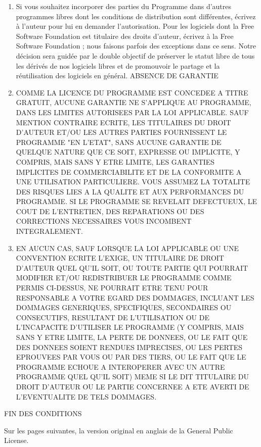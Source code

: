 {\begin{enumerate}
\item  Si vous souhaitez incorporer des parties du Programme dans d'autres programmes libres dont les conditions de distribution sont différentes, écrivez à l'auteur pour lui en demander l'autorisation. Pour les logiciels dont la Free Software Foundation est titulaire des droits d'auteur, écrivez à la Free Software Foundation ; nous faisons parfois des exceptions dans ce sens. Notre décision sera guidée par le double objectif de préserver le statut libre de tous les dérivés de nos logiciels libres et de promouvoir le partage et la réutilisation des logiciels en général.
ABSENCE DE GARANTIE

\item  COMME LA LICENCE DU PROGRAMME EST CONCEDEE A TITRE GRATUIT, AUCUNE GARANTIE NE S'APPLIQUE AU PROGRAMME, DANS LES LIMITES AUTORISEES PAR LA LOI APPLICABLE. SAUF MENTION CONTRAIRE ECRITE, LES TITULAIRES DU DROIT D'AUTEUR ET/OU LES AUTRES PARTIES FOURNISSENT LE PROGRAMME "EN L'ETAT", SANS AUCUNE GARANTIE DE QUELQUE NATURE QUE CE SOIT, EXPRESSE OU IMPLICITE, Y COMPRIS, MAIS SANS Y ETRE LIMITE, LES GARANTIES IMPLICITES DE COMMERCIABILITE ET DE LA CONFORMITE A UNE UTILISATION PARTICULIERE. VOUS ASSUMEZ LA TOTALITE DES RISQUES LIES A LA QUALITE ET AUX PERFORMANCES DU PROGRAMME. SI LE PROGRAMME SE REVELAIT DEFECTUEUX, LE COUT DE L'ENTRETIEN, DES REPARATIONS OU DES CORRECTIONS NECESSAIRES VOUS INCOMBENT INTEGRALEMENT.

\item  EN AUCUN CAS, SAUF LORSQUE LA LOI APPLICABLE OU UNE CONVENTION ECRITE L'EXIGE, UN TITULAIRE DE DROIT D'AUTEUR QUEL QU'IL SOIT, OU TOUTE PARTIE QUI POURRAIT MODIFIER ET/OU REDISTRIBUER LE PROGRAMME COMME PERMIS CI-DESSUS, NE POURRAIT ETRE TENU POUR RESPONSABLE A VOTRE EGARD DES DOMMAGES, INCLUANT LES DOMMAGES GENERIQUES, SPECIFIQUES, SECONDAIRES OU CONSECUTIFS, RESULTANT DE L'UTILISATION OU DE L'INCAPACITE D'UTILISER LE PROGRAMME (Y COMPRIS, MAIS SANS Y ETRE LIMITE, LA PERTE DE DONNEES, OU LE FAIT QUE DES DONNEES SOIENT RENDUES IMPRECISES, OU LES PERTES EPROUVEES PAR VOUS OU PAR DES TIERS, OU LE FAIT QUE LE PROGRAMME ECHOUE A INTEROPERER AVEC UN AUTRE PROGRAMME QUEL QU'IL SOIT) MEME SI LE DIT TITULAIRE DU DROIT D'AUTEUR OU LE PARTIE CONCERNEE A ETE AVERTI DE L'EVENTUALITE DE TELS DOMMAGES.

		\end{enumerate}


FIN DES CONDITIONS

\vspace{1cm}
Sur les pages suivantes, la version original en anglais de la General Public License. 
\newpage 

}
